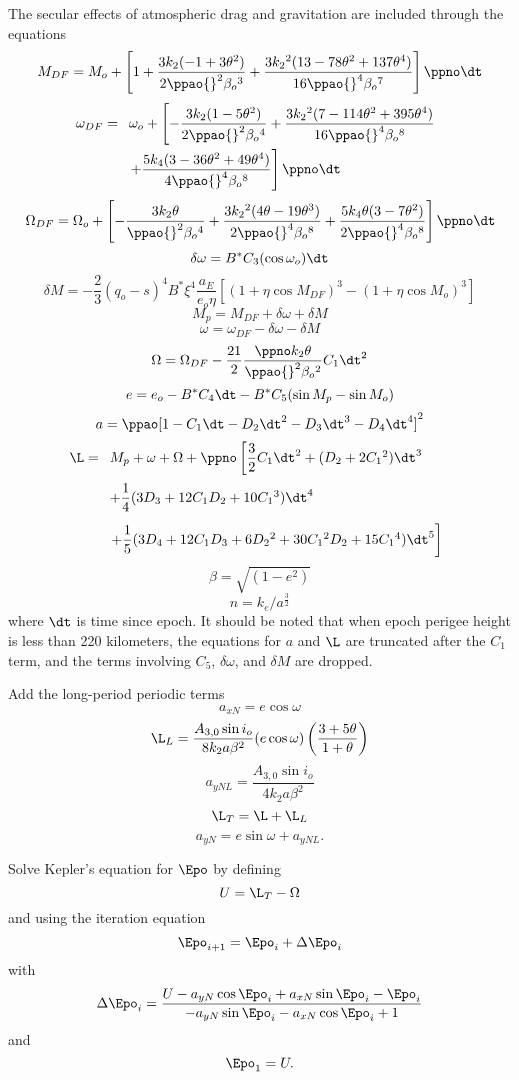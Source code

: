 The secular effects of atmospheric drag and gravitation are included through
the equations
\[M_{DF}=M_o+\left[1+\dfrac{3k_2(-1+3\theta^2)}{2\ppao{}^2\beta_o{}^3}
+\dfrac{3k_2{}^2(13-78\theta^2+137\theta^4)}{16\ppao{}^4\beta_o{}^7}\right]
\ppno\dt\]
\[\omega_{DF}=\begin{array}[t]{l}\omega_o+\left[-\dfrac{3k_2(1-5\theta^2)}{2\ppao{}^2\beta_o{}^4}
+\dfrac{3k_2{}^2(7-114\theta^2+395\theta^4)}{16\ppao{}^4\beta_o{}^8}\right.\\[12pt]
\left.+\dfrac{5k_4(3-36\theta^2+49\theta^4)}{4\ppao{}^4\beta_o{}^8}\right]\ppno\dt
\end{array}\]
\[\Omega_{DF}=\Omega_o+\left[-\dfrac{3k_2\theta}{\ppao{}^2\beta_o{}^4}
+\dfrac{3k_2{}^2(4\theta-19\theta^3)}{2\ppao{}^4\beta_o{}^8}
+\dfrac{5k_4\theta(3-7\theta^2)}{2\ppao{}^4\beta_o{}^8}\right]\ppno\dt\]
\[\delta\omega=B^*C_3(\cos\omega_o)\dt\]
\[\delta M=-\dfrac23(q_o-s)^4B^*\xi^4\dfrac{a_E}{e_o\eta}
[(1+\eta\cos M_{DF})^3-(1+\eta\cos M_o)^3]\]
\[M_p=M_{DF}+\delta\omega+\delta M\]
\[\omega=\omega_{DF}-\delta\omega-\delta M\]
\[\Omega=\Omega_{DF}-\dfrac{21}2\dfrac{\ppno k_2\theta}{\ppao{}^2\beta_o{}^2}
C_1\dt^2\]
\[e=e_o-B^*C_4\dt-B^*C_5(\sin M_p-\sin M_o)\]
\[a=\ppao[1-C_1\dt-D_2\dt^2-D_3\dt^3-D_4\dt^4]^2\]
\[\L=\begin{array}[t]{l}
M_p+\omega+\Omega+\ppno\left[\dfrac32C_1\dt^2+(D_2+2C_1{}^2)\dt^3\right.\\[12pt]
+\dfrac14(3D_3+12C_1D_2+10C_1{}^3)\dt^4\\[12pt]
\left.+\dfrac15(3D_4+12C_1D_3+6D_2{}^2+30C_1{}^2D_2+15C_1{}^4)\dt^5\right]
\end{array}\]
\[\beta=\sqrt{(1-e^2)}\]
\[n=k_e\bigg/a^{\frac32}\]
where $\dt$ is time since epoch.  It should be noted that when epoch perigee
height is less than 220 kilometers, the equations for $a$ and $\L$ are
truncated after the $C_1$ term, and the terms involving $C_5$, $\delta\omega$,
and $\delta M$ are dropped.

Add the long-period periodic terms
\[a_{xN}=e\cos\omega\]
\[\L_L=\dfrac{A_{3,0}\sin i_o}{8k_2a\beta^2}(e\cos\omega)
\left(\dfrac{3+5\theta}{1+\theta}\right)\]
\[a_{yNL}=\dfrac{A_{3,0}\sin i_o}{4k_2a\beta^2}\]
\[\L_T=\L+\L_L\]
\[a_{yN}=e\sin\omega+a_{yNL}.\]

Solve Kepler's equation for $\Epo$ by defining
\[U=\L_T-\Omega\]
and using the iteration equation
\[\Epo_{i+1}=\Epo_i+\Delta\Epo_i\]
with
\[\Delta\Epo_i =
\dfrac{U-a_{yN}\cos\Epo_i+a_{xN}\sin\Epo_i-\Epo_i}
{-a_{yN}\sin\Epo_i-a_{xN}\cos\Epo_i+1}\]
and
\[\Epo_1=U.\]

